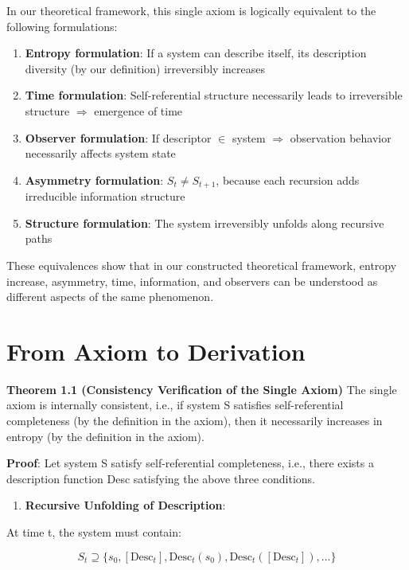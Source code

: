 In our theoretical framework, this single axiom is logically equivalent to the following formulations:

\begin{enumerate}
\item \textbf{Entropy formulation}: If a system can describe itself, its description diversity (by our definition) irreversibly increases
\item \textbf{Time formulation}: Self-referential structure necessarily leads to irreversible structure $\Rightarrow$ emergence of time
\item \textbf{Observer formulation}: If descriptor $\in$ system $\Rightarrow$ observation behavior necessarily affects system state
\item \textbf{Asymmetry formulation}: $S_t \neq S_{t+1}$, because each recursion adds irreducible information structure
\item \textbf{Structure formulation}: The system irreversibly unfolds along recursive paths
\end{enumerate}

These equivalences show that in our constructed theoretical framework, entropy increase, asymmetry, time, information, and observers can be understood as different aspects of the same phenomenon.

\section{From Axiom to Derivation}
\label{sec:ch01_axiom_and_derivation:from-axiom-to-derivation}

\textbf{Theorem 1.1 (Consistency Verification of the Single Axiom)}
\label{thm:1.1}
The single axiom is internally consistent, i.e., if system S satisfies self-referential completeness (by the definition in the axiom), then it necessarily increases in entropy (by the definition in the axiom).

\textbf{Proof}:
Let system S satisfy self-referential completeness, i.e., there exists a description function Desc satisfying the above three conditions.

\begin{enumerate}
\item \textbf{Recursive Unfolding of Description}:
\end{enumerate}
  At time t, the system must contain:
  
\begin{equation}
S_t \supseteq \{s_0, [\text{Desc}_t], \text{Desc}_t(s_0), \text{Desc}_t([\text{Desc}_t]), ...\}
\end{equation}

